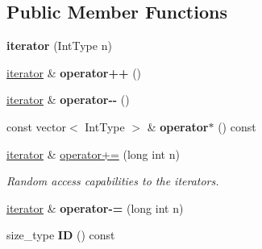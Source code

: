 \subsection*{Public Member Functions}
\begin{DoxyCompactItemize}
\item 
\hypertarget{classdscr_1_1basic__permutations_1_1iterator_a42aba4a30c7d9225c0108afdd0471982}{{\bfseries iterator} (Int\-Type n)}\label{classdscr_1_1basic__permutations_1_1iterator_a42aba4a30c7d9225c0108afdd0471982}

\item 
\hypertarget{classdscr_1_1basic__permutations_1_1iterator_a2db24401b75963582838437bafeed1d8}{\hyperlink{classdscr_1_1basic__permutations_1_1iterator}{iterator} \& {\bfseries operator++} ()}\label{classdscr_1_1basic__permutations_1_1iterator_a2db24401b75963582838437bafeed1d8}

\item 
\hypertarget{classdscr_1_1basic__permutations_1_1iterator_acb908cc12a7babf06669fc1452394e09}{\hyperlink{classdscr_1_1basic__permutations_1_1iterator}{iterator} \& {\bfseries operator-\/-\/} ()}\label{classdscr_1_1basic__permutations_1_1iterator_acb908cc12a7babf06669fc1452394e09}

\item 
\hypertarget{classdscr_1_1basic__permutations_1_1iterator_a1e12a3351b0ae1be085b23fb0bebdc44}{const vector$<$ Int\-Type $>$ \& {\bfseries operator$\ast$} () const }\label{classdscr_1_1basic__permutations_1_1iterator_a1e12a3351b0ae1be085b23fb0bebdc44}

\item 
\hyperlink{classdscr_1_1basic__permutations_1_1iterator}{iterator} \& \hyperlink{classdscr_1_1basic__permutations_1_1iterator_a89238333e4ca83dd4d75f62c709f9ff1}{operator+=} (long int n)
\begin{DoxyCompactList}\small\item\em Random access capabilities to the iterators. \end{DoxyCompactList}\item 
\hypertarget{classdscr_1_1basic__permutations_1_1iterator_a4a57770c7df7ac3441d59d552d01e874}{\hyperlink{classdscr_1_1basic__permutations_1_1iterator}{iterator} \& {\bfseries operator-\/=} (long int n)}\label{classdscr_1_1basic__permutations_1_1iterator_a4a57770c7df7ac3441d59d552d01e874}

\item 
\hypertarget{classdscr_1_1basic__permutations_1_1iterator_a0fbeac6dafcec1feb5c0d5f4f697c87c}{size\-\_\-type {\bfseries I\-D} () const }\label{classdscr_1_1basic__permutations_1_1iterator_a0fbeac6dafcec1feb5c0d5f4f697c87c}


\end{DoxyCompactItemize}
